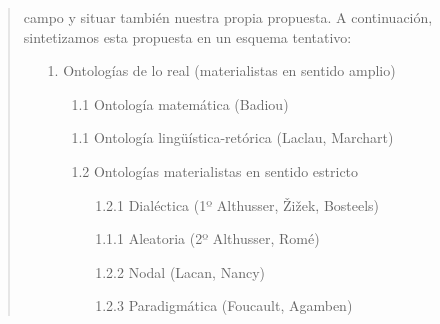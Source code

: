 \begin{quote}
campo y situar también nuestra propia propuesta. A continuación, sintetizamos esta propuesta en un esquema tentativo:


\begin{itemize} %
	\item[1.] Ontologías de lo real (materialistas en sentido amplio)
	\begin{itemize} %
		\item[1.1] Ontología matemática (Badiou)
		\item[1.1] Ontología lingüística-retórica (Laclau, Marchart)
		\item[1.2] Ontologías materialistas en sentido estricto
		\begin{itemize} %
			\item[1.2.1] Dialéctica (1º Althusser, Žižek, Bosteels)
			\item[1.1.1] Aleatoria (2º Althusser, Romé)
			\item[1.2.2] Nodal (Lacan, Nancy)
			\item[1.2.3] Paradigmática (Foucault, Agamben)
		\end{itemize}
	\end{itemize}
\end{itemize}




\end{quote}
